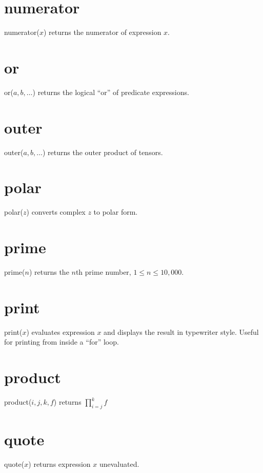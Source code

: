 \documentclass[12pt]{book}
\begin{document}
\section*{numerator}
numerator($x$) returns the numerator of expression $x$.

\section*{or}
or($a,b,\ldots$) returns the logical ``or'' of predicate expressions.

\section*{outer}
outer($a,b,\ldots$) returns the outer product of tensors.

\section*{polar}
polar($z$) converts complex $z$ to polar form.

\section*{prime}
prime($n$) returns the $n$th prime number, $1\le n\le10{,}000$.

\section*{print}
print($x$) evaluates expression $x$ and displays the result in typewriter style.
Useful for printing from inside a ``for'' loop.

\section*{product}
product($i,j,k,f$) returns $\displaystyle\prod_{i=j}^k f$

\section*{quote}
quote($x$) returns expression $x$ unevaluated.
\end{document}
